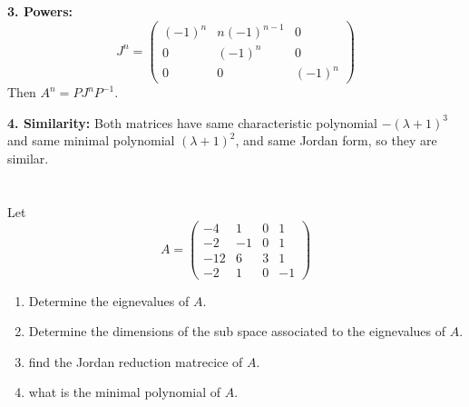\documentclass[12pt]{article}
\begin{document}
\begin{correctionbox}
\textbf{3. Powers:}
\[
J^n = \begin{pmatrix} (-1)^n & n(-1)^{n-1} & 0 \\ 0 & (-1)^n & 0 \\ 0 & 0 & (-1)^n \end{pmatrix}
\]
Then $A^n = PJ^nP^{-1}$.

\textbf{4. Similarity:}
Both matrices have same characteristic polynomial $-(\lambda+1)^3$ and same minimal polynomial $(\lambda+1)^2$, and same Jordan form, so they are similar.
\end{correctionbox}

\section{}
Let $$A = \begin{pmatrix} -4 & 1 & 0 & 1 \\ -2 & -1 & 0 & 1 \\ - 12 & 6 & 3 & 1 \\ -2 & 1 & 0 & -1 \end{pmatrix}$$
\begin{enumerate}
  \item Determine the eignevalues of $A$.
  \item Determine the dimensions of the sub space associated to the eignevalues of $A$.
  \item find the Jordan reduction matrecice of $A$.
  \item what is the minimal polynomial of $A$. 
\end{enumerate}
\end{document}
